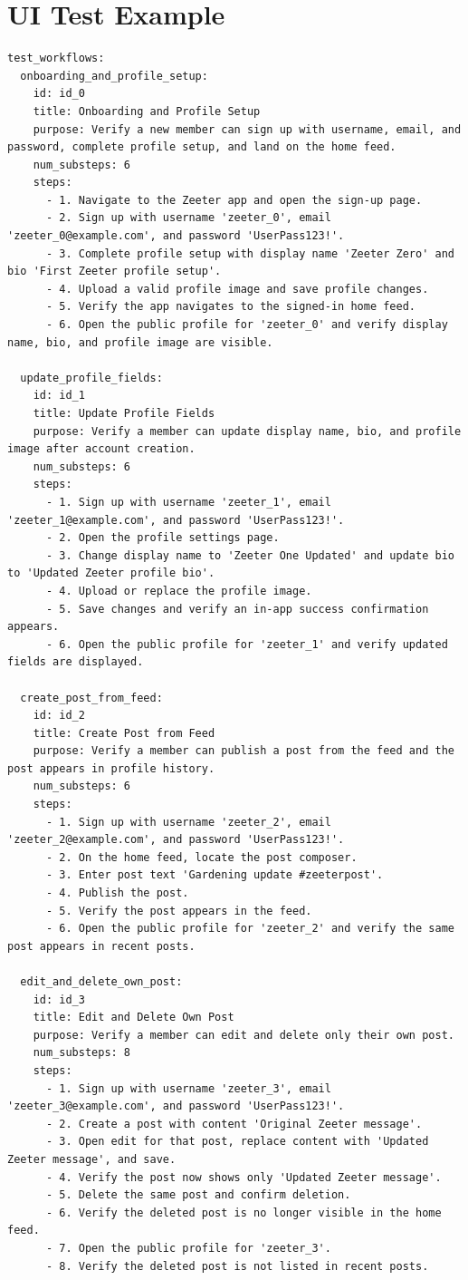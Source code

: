 \section{UI Test Example}
\label{sec:appendix-ui-test-example}
\begin{lstlisting}
test_workflows:
  onboarding_and_profile_setup:
    id: id_0
    title: Onboarding and Profile Setup
    purpose: Verify a new member can sign up with username, email, and password, complete profile setup, and land on the home feed.
    num_substeps: 6
    steps:
      - 1. Navigate to the Zeeter app and open the sign-up page.
      - 2. Sign up with username 'zeeter_0', email 'zeeter_0@example.com', and password 'UserPass123!'.
      - 3. Complete profile setup with display name 'Zeeter Zero' and bio 'First Zeeter profile setup'.
      - 4. Upload a valid profile image and save profile changes.
      - 5. Verify the app navigates to the signed-in home feed.
      - 6. Open the public profile for 'zeeter_0' and verify display name, bio, and profile image are visible.

  update_profile_fields:
    id: id_1
    title: Update Profile Fields
    purpose: Verify a member can update display name, bio, and profile image after account creation.
    num_substeps: 6
    steps:
      - 1. Sign up with username 'zeeter_1', email 'zeeter_1@example.com', and password 'UserPass123!'.
      - 2. Open the profile settings page.
      - 3. Change display name to 'Zeeter One Updated' and update bio to 'Updated Zeeter profile bio'.
      - 4. Upload or replace the profile image.
      - 5. Save changes and verify an in-app success confirmation appears.
      - 6. Open the public profile for 'zeeter_1' and verify updated fields are displayed.

  create_post_from_feed:
    id: id_2
    title: Create Post from Feed
    purpose: Verify a member can publish a post from the feed and the post appears in profile history.
    num_substeps: 6
    steps:
      - 1. Sign up with username 'zeeter_2', email 'zeeter_2@example.com', and password 'UserPass123!'.
      - 2. On the home feed, locate the post composer.
      - 3. Enter post text 'Gardening update #zeeterpost'.
      - 4. Publish the post.
      - 5. Verify the post appears in the feed.
      - 6. Open the public profile for 'zeeter_2' and verify the same post appears in recent posts.

  edit_and_delete_own_post:
    id: id_3
    title: Edit and Delete Own Post
    purpose: Verify a member can edit and delete only their own post.
    num_substeps: 8
    steps:
      - 1. Sign up with username 'zeeter_3', email 'zeeter_3@example.com', and password 'UserPass123!'.
      - 2. Create a post with content 'Original Zeeter message'.
      - 3. Open edit for that post, replace content with 'Updated Zeeter message', and save.
      - 4. Verify the post now shows only 'Updated Zeeter message'.
      - 5. Delete the same post and confirm deletion.
      - 6. Verify the deleted post is no longer visible in the home feed.
      - 7. Open the public profile for 'zeeter_3'.
      - 8. Verify the deleted post is not listed in recent posts.


\end{lstlisting}

